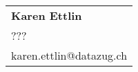 \begin{tabular}[width=0.48\textwidth]{l}
\textbf{Karen Ettlin} \\
??? \\
karen.ettlin@datazug.ch \\
\end{tabular}



